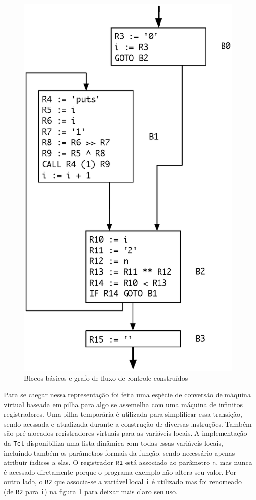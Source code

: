 \begin{figure}[h]
  \centering
  \includegraphics[scale=0.68]{bbs}
  \caption{Blocos básicos e grafo de fluxo de controle construídos \label{bbs}}
\end{figure}

Para se chegar nessa representação foi feita uma espécie de conversão de
máquina virtual baseada em pilha para algo se assemelha
com uma máquina de infinitos registradores. Uma pilha temporária é
utilizada para simplificar essa transição, sendo acessada e atualizada
durante a construção de diversas instruções. Também são pré-alocados
registradores virtuais para as variáveis locais. A implementação da
\texttt{Tcl} disponibiliza uma lista dinâmica com todas essas
variáveis locais, incluindo também os parâmetros formais da função,
sendo necessário apenas atribuir índices a elas. O registrador
\verb!R1! está associado ao parâmetro \verb!n!, mas nunca é acessado
diretamente porque o programa exemplo não altera seu valor. Por outro
lado, o \verb!R2! que associa-se a variável local \verb!i! é utilizado
mas foi renomeado (de \verb!R2! para \verb!i!) na figura \ref{bbs} para
deixar mais claro seu uso.

